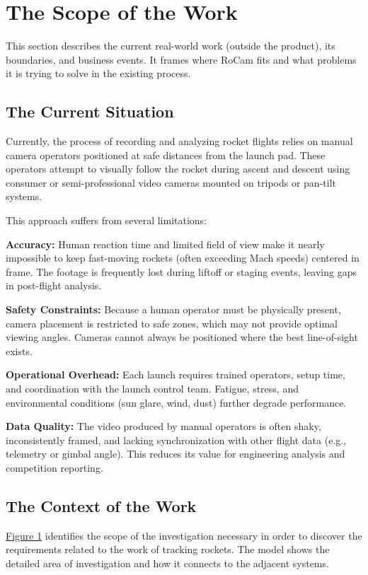 \documentclass[12pt]{article}
\begin{document}
\section{The Scope of the Work}
This section describes the current real-world work (outside the product), its boundaries, and business events.
It frames where RoCam fits and what problems it is trying to solve in the existing process.

\subsection{The Current Situation}

Currently, the process of recording and analyzing rocket flights relies on
manual camera operators positioned at safe distances from the launch pad. These
operators attempt to visually follow the rocket during ascent and descent using
consumer or semi-professional video cameras mounted on tripods or pan-tilt
systems.

This approach suffers from several limitations:

\textbf{Accuracy:} Human reaction time and limited field of view make it nearly
impossible to keep fast-moving rockets (often exceeding Mach speeds) centered
in frame. The footage is frequently lost during liftoff or staging events,
leaving gaps in post-flight analysis.

\textbf{Safety Constraints:} Because a human operator must be physically present, camera
placement is restricted to safe zones, which may not provide optimal viewing
angles. Cameras cannot always be positioned where the best line-of-sight
exists.

\textbf{Operational Overhead:} Each launch requires trained operators, setup time, and
coordination with the launch control team. Fatigue, stress, and environmental
conditions (sun glare, wind, dust) further degrade performance.

\textbf{Data Quality:} The video produced by manual operators is often shaky,
inconsistently framed, and lacking synchronization with other flight data
(e.g., telemetry or gimbal angle). This reduces its value for engineering
analysis and competition reporting.

\subsection{The Context of the Work}

\hyperref[img:context-of-work]{Figure 1} identifies the scope of the
investigation necessary in order to discover the requirements related to the
work of tracking rockets. The model shows the detailed area of investigation
and how it connects to the adjacent systems.
\end{document}
